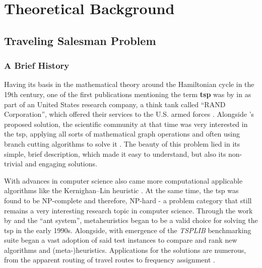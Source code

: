 
\chapter{Theoretical Background} %
\label{chap:background}
\glsresetall

\section{Traveling Salesman Problem}
\label{chap:tsp}

\subsection{A Brief History}

Having its basis in the mathematical theory around the Hamiltonian cycle in the 19th century, one of the first publications mentioning the term \textbf{\gls{tsp}} was by  in \citeyear{robinson1949hamiltonian} as part of an United States research company, a think tank called \enquote{RAND Corporation}, which offered their services to the U.S. armed forces \cite{schrijver2005history}. Alongside \citeauthor{robinson1949hamiltonian}'s proposed solution, the scientific community at that time was very interested in the \gls{tsp}, applying all sorts of mathematical graph operations and often using branch cutting algorithms to solve it \cite{lawler1985traveling}. The beauty of this problem lied in its simple, brief description, which made it easy to understand, but also its non-trivial and engaging solutions.

With advances in computer science also came more computational applicable algorithms like the Kernighan–Lin heuristic \cite{lin1973effective}. At the same time, the \gls{tsp} was found to be NP-complete and therefore, NP-hard \cite{papadimitriou1976some} - a problem category that still remains a very interesting research topic in computer science. Through the work by \citet{dorigo1991ant} and the \enquote{ant system}, metaheuristics began to be a valid choice for solving the \gls{tsp} in the early 1990s. Alongside, with emergence of the \textit{TSPLIB} benchmarking suite \cite{reinelt1991tsplib} began a vast adoption of said test instances to compare and rank new algorithms and (meta-)heuristics.
Applications for the solutions are numerous, from the apparent routing of travel routes to frequency assignment \cite{punnen2007traveling}.

